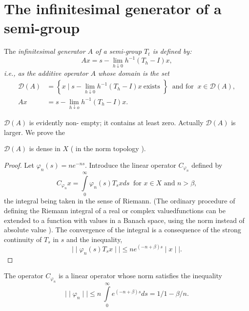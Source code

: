 \section{The infinitesimal generator of a semi-group}\label{chap5:sec2}

\begin{defi*}
 The \em{infinitesimal generator } $A$ of a semi-group $ T_t $ is
 defined by: 
 $$
 A x = s- \lim_{h \downarrow 0 } h^{-1} ( T_h - I) x, 
 $$
 i.e., as the additive operator $A$ whose domain is the set 
 \begin{align*}
 \mathscr{D} (A) &= \left\{ x \mid s- \lim \limits_{h \downarrow 0}
 h^{-1} (T_h- I ) x ~\text{exists }\right\} ~\text{ and for }~ 
 x \in \mathscr{D} (A),\\  
 A x & = s - \lim_{h \downarrow o} h^{-1} ( T_h -I ) x. 
 \end{align*}
\end{defi*} 

$ \mathscr{D} (A) $ is evidently non- empty; it contains at least
zero. Actually $ \mathscr{D} (A) $ is larger. We prove the 

\begin{prop*}
 $ \mathscr{D} (A) $ is dense in $X$ ( in the norm topology ).
\end{prop*}

\begin{proof}
 Let $ \varphi_n (s) = n e^{-ns} $. Introduce the linear operator $
 C_{\varphi_{n}} $ defined by 
 $$ 
 C_{\varphi_{n}} x = \int\limits^{\infty}_{0} \varphi_n (s) T_s x
 ds ~\text{ for } x \in X \text{ and } n > \beta, 
 $$
 the integral being taken in the sense of Riemann. (The ordinary
 procedure of defining the Riemann integral of a real or complex
 valued\pageoriginale func\-tions can be extended to a function with values in a
 Banach space, using the norm instead of absolute value ). The
 convergence of the integral is a consequence of the strong
 continuity of $ T_s $ in $s$ and the inequality, 
 $$
 \mid\mid \varphi_n (s) T_s x \mid\mid \leq n e^{( -n + \beta) s} \mid x \mid\mid.
 $$
\end{proof}

 The operator $ C_{\varphi_{n}} $ is a linear operator whose norm
 satisfies the inequality 
 $$
 \mid\mid \varphi_n \mid\mid \leq n ~ \int \limits^{\infty}_{0} e^{(
  -n + \beta) s} ds = 1/1 - \beta/n. 
 $$

